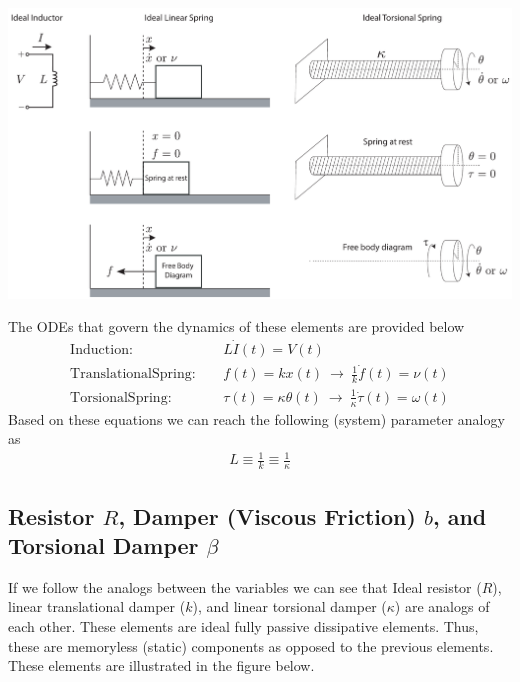 \documentclass[twoside]{article}
\theoremstyle{definition}
\begin{document}
  \begin{minipage}[h]{1\linewidth}
    \begin{center}
      \includegraphics[width=1\textwidth]{ind}
    \end{center}
  \end{minipage}

The ODEs that govern the dynamics of these elements are provided below
%
\begin{align*}
\mathrm{Induction:}& \quad L \dot{I}(t) = V(t) \\
\mathrm{Translational Spring:}& \quad  f(t) = k x(t) \ \rightarrow \
                                \frac{1}{k} \dot{f}(t) = \nu(t)
\\
\mathrm{Torsional Spring:}& \quad  \tau (t) = \kappa \theta(t) \
                            \rightarrow \ \frac{1}{\kappa} \dot{\tau}(t) = \omega(t)
\end{align*}
%
Based on these equations we can reach the following (system) parameter
analogy as
%
\begin{align*}
 L \equiv \frac{1}{k} \equiv \frac{1}{\kappa}
\end{align*}
% 

\subsection{Resistor $R$, Damper (Viscous Friction) $b$, and
Torsional Damper $\beta$}

If we follow the analogs between the variables we can see that Ideal
resistor ($R$), linear translational damper ($k$), and linear
torsional damper ($\kappa$) are analogs of each other. 
These elements are ideal fully passive dissipative elements.
Thus, these are memoryless (static) components as opposed to the
previous elements. These elements are illustrated in the figure below. 
\end{document}
